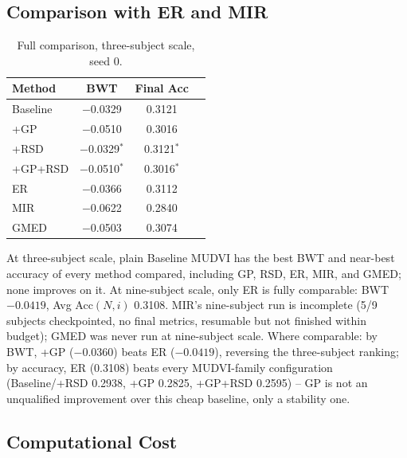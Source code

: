\documentclass[conference]{IEEEtran}
\begin{document}
\subsection{Comparison with ER and MIR}
\label{sec:ermir}

\begin{table}[t]
\caption{Full comparison, three-subject scale, seed 0.}
\label{tab:comparison}
\centering
\small
\begin{tabular}{@{}lccc@{}}
\toprule
Method & BWT & Final Acc \\
\midrule
Baseline & $-$0.0329 & 0.3121 \\
+GP & $-$0.0510 & 0.3016 \\
+RSD & $-$0.0329$^{*}$ & 0.3121$^{*}$ \\
+GP+RSD & $-$0.0510$^{*}$ & 0.3016$^{*}$ \\
ER & $-$0.0366 & 0.3112 \\
MIR & $-$0.0622 & 0.2840 \\
GMED & $-$0.0503 & 0.3074 \\
\bottomrule
\end{tabular}
\end{table}

At three-subject scale, plain Baseline MUDVI has the best BWT and near-best accuracy of every method compared, including GP, RSD, ER, MIR, and GMED; none improves on it. At nine-subject scale, only ER is fully comparable: BWT $-0.0419$, Avg Acc$(N,i)$ 0.3108. MIR's nine-subject run is incomplete (5/9 subjects checkpointed, no final metrics, resumable but not finished within budget); GMED was never run at nine-subject scale. Where comparable: by BWT, +GP ($-0.0360$) beats ER ($-0.0419$), reversing the three-subject ranking; by accuracy, ER (0.3108) beats every MUDVI-family configuration (Baseline/+RSD 0.2938, +GP 0.2825, +GP+RSD 0.2595) -- GP is not an unqualified improvement over this cheap baseline, only a stability one.

\subsection{Computational Cost}
\label{sec:cost}
\end{document}

